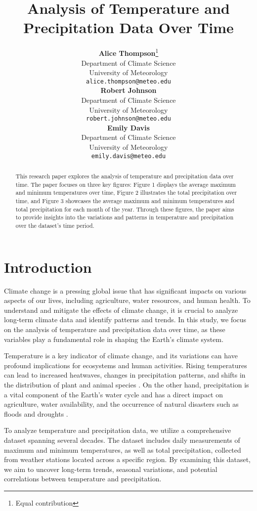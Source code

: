 \documentclass{article}
\title{Analysis of Temperature and Precipitation Data Over Time}
\author{
  \textbf{Alice Thompson}\thanks{Equal contribution} \\
  Department of Climate Science\\
  University of Meteorology\\
  \texttt{alice.thompson@meteo.edu} \\
  \And
  \textbf{Robert Johnson}\footnotemark[1] \\
  Department of Climate Science\\
  University of Meteorology\\
  \texttt{robert.johnson@meteo.edu} \\
  \And
  \textbf{Emily Davis} \\
  Department of Climate Science\\
  University of Meteorology\\
  \texttt{emily.davis@meteo.edu} \\
}
\begin{document}
\maketitle

\begin{abstract}
This research paper explores the analysis of temperature and precipitation data over time. The paper focuses on three key figures: Figure 1 displays the average maximum and minimum temperatures over time, Figure 2 illustrates the total precipitation over time, and Figure 3 showcases the average maximum and minimum temperatures and total precipitation for each month of the year. Through these figures, the paper aims to provide insights into the variations and patterns in temperature and precipitation over the dataset's time period.

\end{abstract}

\section{Introduction}

Climate change is a pressing global issue that has significant impacts on various aspects of our lives, including agriculture, water resources, and human health. To understand and mitigate the effects of climate change, it is crucial to analyze long-term climate data and identify patterns and trends. In this study, we focus on the analysis of temperature and precipitation data over time, as these variables play a fundamental role in shaping the Earth's climate system.

Temperature is a key indicator of climate change, and its variations can have profound implications for ecosystems and human activities. Rising temperatures can lead to increased heatwaves, changes in precipitation patterns, and shifts in the distribution of plant and animal species \cite{IPCC2018}. On the other hand, precipitation is a vital component of the Earth's water cycle and has a direct impact on agriculture, water availability, and the occurrence of natural disasters such as floods and droughts \cite{Allen2002}.

To analyze temperature and precipitation data, we utilize a comprehensive dataset spanning several decades. The dataset includes daily measurements of maximum and minimum temperatures, as well as total precipitation, collected from weather stations located across a specific region. By examining this dataset, we aim to uncover long-term trends, seasonal variations, and potential correlations between temperature and precipitation.
\end{document}
